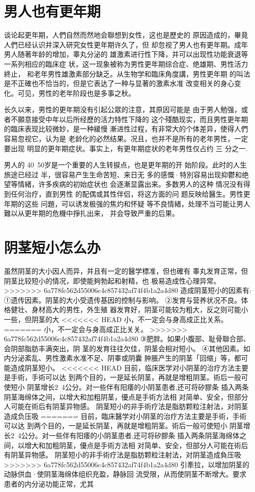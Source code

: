 \documentclass[12pt,UTF8]{ctexbook}
\begin{document}
\section{男人也有更年期}

谈论起更年期，人們自然而然地会聯想到女性，这也是歷史的
原因造成的，畢竟人們已经认识并深入研究女性更年期许久了，但
却忽视了男人也有更年期。成年男人随著年龄的增加，睾丸分泌的
雄激素进行性下降，并可以出现性功能衰退等一系列相应的臨床症
状，这一现象被称为男性更年期综合症、绝雄期、男性活力終止，
和老年男性雄激素部分缺乏。从生物学和臨床角度講，男性更年期
的叫法是不正確也不恰当的，但是它表达了一种与显著的激素水准
改变相关的身心变化。可见，男性的老年阶段也是多事之秋。

长久以来，男性的更年期没有引起公眾的注意，其原因可能是
由于男人勉强，或者不願意接受中年以后所经歷的活力特性下降的
这个殘酷现实，而且男性更年期的臨床表现比较微妙，是一种緩慢
漸进性过程，有非常大的个体差异，使得人們容易忽视它，认为是
老龄化的必然结果。况且，也并不是所有的老年男性，一定要出现
明显的更年期症状。事实上，有更年期症状的老年男性仅占约 三
分之一.

男人的 40~50岁是一个重要的人生转捩点，也是更年期的开
始阶段。此时的人生旅途已经过
半，很容易产生生命苦短、来日无
多的感慨·特別容易出现抑鬱和绝
望等情緒，许多疾病的初始症状也
会逐漸显露出来。多数男人的这种
情况没有得到任何治疗，直到男性
的配偶或其性伴侣，将这方面的问
题反映给醫生。男性更年期的这些
问題，可以诱发极强的焦灼和怀疑
等不良情緒，处理不当可能让男人
難以从更年期的危機中掙扎出来，
并会导致严重的后果。

\section{阴茎短小怎么办}

虽然阴茎的大小因人而异，并且有一定的醫学標准，但也確有
睾丸发育正常，但阴茎比较短小的情况，即使能夠勃起和射精，也
极易造成性心理异常。
>>>>>>> 6a778fc562d55006c4c857432af74f4b1a2a4d80
造成阴茎短小的因素有:
①遗传因素。阴茎的大小受遗传基因的控制与影响。
②发育与营养状况不良。体格健壮、身材高大的男性，外生殖
器发育好，阴茎可能较为粗大，反之则可能小一些，但阴茎的大
<<<<<<< HEAD
小，不一定会与身高成正比关系。
=======
小，不一定会与身高成正比关关。
>>>>>>> 6a778fc562d55006c4c857432af74f4b1a2a4d80
③肥胖。如果小腹部、耻骨聯合部、会阴部脂肪丰满突出，阴
茎的发育往往欠佳，阴茎会相对短小。
④其他因素。如内分泌紊乱、男性激素水准不足、阴睾或阴囊
肿脹产生的阴茎「回缩」等，都可能造成阴茎短小。
<<<<<<< HEAD
目前，临床医学对小阴茎的治疗方法主要是手術，手術可以达
到两个目的，一是延长阴茎，再就是增粗阴茎。術后一般可使短小
阴茎增长2~4公分。对一些伴有阳痿的小阴茎患者,还可将矽膠条
插入两条阴茎海绵体之间，以增大和加粗阴茎，優点是手術方法相
对简单、安全，但部分人可能在術后有阴茎异物感。
阴茎短小的非手術疗法是脂肪颗粒注射法，对阴茎造成负压吸
=======
目前，臨床醫学对小阴茎的治疗方法主要是手術，手術可以达
到两个目的，一是延长阴茎，再就是增粗阴茎。術后一般可使短小
阴茎增长2~4公分。对一些伴有阳痿的小阴茎患者,还可将矽膠条
插入两条阴茎海绵体之间，以增大和加粗阴茎，優点是手術方法相
对简单、安全，但部分人可能在術后有阴茎异物感。
阴茎短小的非手術疗法是脂肪颗粒注射法，对阴茎造成負压吸
>>>>>>> 6a778fc562d55006c4c857432af74f4b1a2a4d80
引牽拉，以增加阴茎的动脉供血·使阴茎海绵体组织充盈，静脉回
流受限，从而使阴茎不断增大。要求患者的内分泌功能正常，尤其
\end{document}
